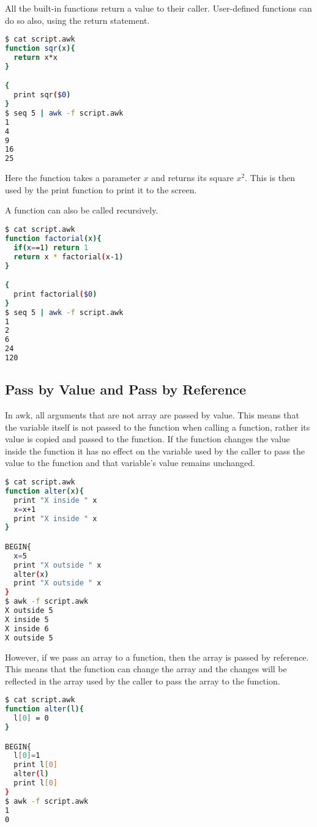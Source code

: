 All the built-in functions return a value to their caller. User-defined functions can do so also, using the return statement.

\begin{lstlisting}[language=bash]
$ cat script.awk
function sqr(x){
  return x*x
}

{
  print sqr($0)
}
$ seq 5 | awk -f script.awk
1
4
9
16
25
\end{lstlisting}

Here the function takes a parameter $x$ and returns its square $x^2$. This is then used by the print function to print it to the screen.

A function can also be called recursively.

\begin{lstlisting}[language=bash]
$ cat script.awk
function factorial(x){
  if(x==1) return 1
  return x * factorial(x-1)
}

{
  print factorial($0)
}
$ seq 5 | awk -f script.awk
1
2
6
24
120
\end{lstlisting}

\subsection{Pass by Value and Pass by Reference}

In awk, all arguments that are not array are passed by value. This means that the variable itself is not passed to the function when calling a function, rather its value is copied and passed to the function. If the function changes the value inside the function it has no effect on the variable used by the caller to pass the value to the function and that variable's value remains unchanged.

\begin{lstlisting}[language=bash]
$ cat script.awk
function alter(x){
  print "X inside " x
  x=x+1
  print "X inside " x
}

BEGIN{
  x=5
  print "X outside " x
  alter(x)
  print "X outside " x
}
$ awk -f script.awk
X outside 5
X inside 5
X inside 6
X outside 5
\end{lstlisting}

However, if we pass an array to a function, then the array is passed by reference. This means that the function can change the array and the changes will be reflected in the array used by the caller to pass the array to the function.

\begin{lstlisting}[language=bash]
$ cat script.awk
function alter(l){
  l[0] = 0
}

BEGIN{
  l[0]=1
  print l[0]
  alter(l)
  print l[0]
}
$ awk -f script.awk
1
0
\end{lstlisting}


